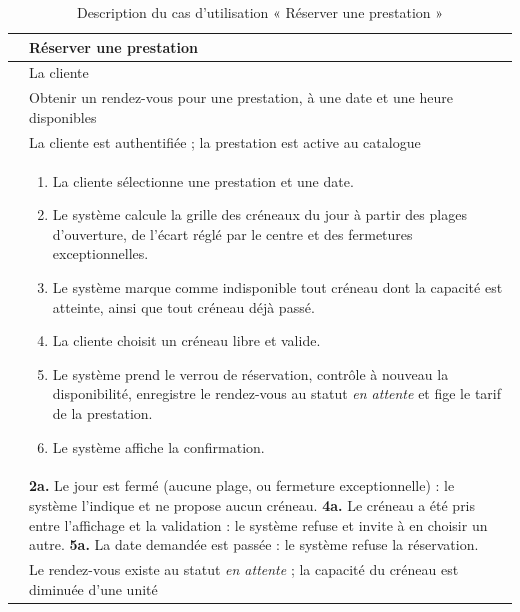 \begin{table}[H]
\centering
\caption{Description du cas d'utilisation « Réserver une prestation »}
\label{tab:cu-reserver}
\begin{tabularx}{\textwidth}{L{3.1cm} X}
\toprule
{} & Réserver une prestation \\
\midrule
{} & La cliente \\
 & Obtenir un rendez-vous pour une prestation, à une date et
une heure disponibles \\
 & La cliente est authentifiée ; la prestation est active
au catalogue \\
 &
\begin{enumerate}[leftmargin=*,nosep]
  \item La cliente sélectionne une prestation et une date.
  \item Le système calcule la grille des créneaux du jour à partir des plages
  d'ouverture, de l'écart réglé par le centre et des fermetures
  exceptionnelles.
  \item Le système marque comme indisponible tout créneau dont la capacité est
  atteinte, ainsi que tout créneau déjà passé.
  \item La cliente choisit un créneau libre et valide.
  \item Le système prend le verrou de réservation, contrôle à nouveau la
  disponibilité, enregistre le rendez-vous au statut \textit{en attente} et fige
  le tarif de la prestation.
  \item Le système affiche la confirmation.
\end{enumerate} \\
 &
\textbf{2a.} Le jour est fermé (aucune plage, ou fermeture exceptionnelle) : le
système l'indique et ne propose aucun créneau.\newline
\textbf{4a.} Le créneau a été pris entre l'affichage et la validation : le
système refuse et invite à en choisir un autre.\newline
\textbf{5a.} La date demandée est passée : le système refuse la réservation. \\
 & Le rendez-vous existe au statut \textit{en attente} ;
la capacité du créneau est diminuée d'une unité \\
\bottomrule
\end{tabularx}
\end{table}

